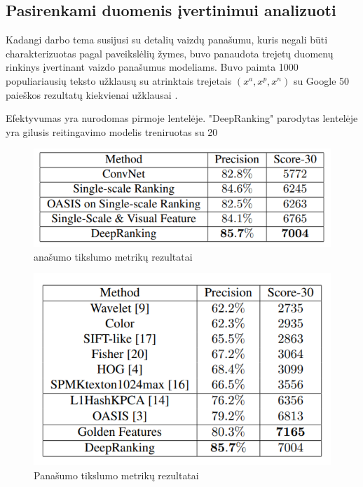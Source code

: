 \documentclass{VUMIFPSkursinis}
\begin{document}
\subsection{Pasirenkami duomenis įvertinimui analizuoti}
Kadangi darbo tema susijusi su detalių vaizdų panašumu, kuris negali būti charakterizuotas pagal paveikslėlių žymes, buvo panaudota trejetų duomenų rinkinys įvertinant vaizdo panašumus modeliams.
Buvo paimta 1000 populiariausių teksto užklausų su atrinktais trejetais $(x^a, x^p, x^n)$ su Google 50 paieškos rezultatų kiekvienai užklausai \cite{Learning_fine_grained_image}.

Efektyvumas yra nurodomas pirmoje lentelėje. "DeepRanking" parodytas lentelėje yra gilusis reitingavimo modelis treniruotas su 20%
\begin{figure}[H]
\centering
\includegraphics[scale=0.7]{img/Similarity_precision_diff_CNN}
\caption{anašumo tikslumo metrikų rezultatai \cite{Learning_fine_grained_image}} %
\label{img:mlp}
\end{figure}

\begin{figure}[H]
\centering
\includegraphics[scale=0.7]{img/Similarity_precision}
\caption{Panašumo tikslumo metrikų rezultatai \cite{Learning_fine_grained_image}} %
\label{img:mlp}
\end{figure}
\pagebreak
\end{document}
